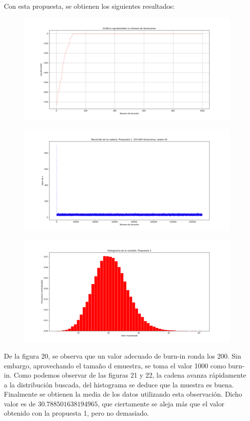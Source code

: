 \documentclass[letterpaper]{article}
\newcommand{\1}{\mathds{1}}
\theoremstyle{definition}
\theoremstyle{definition}
\theoremstyle{definition}
\theoremstyle{definition}
\theoremstyle{definition}
\begin{document}
    Con esta propuesta, se obtienen los siguientes resultados:
    \begin{figure}[h!]
        \centering
        \includegraphics[width=\linewidth]{20.png}
        \caption{}
    \end{figure} 
    \begin{figure}[h!]
        \centering
        \includegraphics[width=\linewidth]{21.png}
        \caption{}
    \end{figure} 
    \begin{figure}[h!]
        \centering
        \includegraphics[width=\linewidth]{22.png}
        \caption{}
    \end{figure} 
    De la figura 20, se observa que un valor adecuado de burn-in ronda los 200. Sin embargo, aprovechando el tamaño d emuestra, se toma 
    el valor 1000 como burn-in. Como podemos observar de las figuras 21 y 22, la cadena avanza rápidamente a la distribución buscada, del histograma 
    se deduce que la muestra es buena. Finalmente se obtienen la media de los datos utilizando esta observación. Dicho valor es de $30.788501638194965$, que
    ciertamente se aleja más que el valor obtenido con la propuesta 1, pero no demasiado.\\
\end{document}
